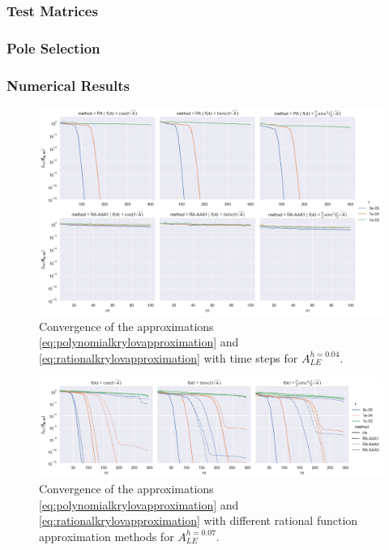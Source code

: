 \subsubsection*{Test Matrices}
\subsubsection*{Pole Selection}
\subsubsection*{Numerical Results}

\begin{figure}[h]
    \centering
    \includegraphics[width=.9\textwidth]{img/trigonometric/cnvg_h4e-02_methods_PA:RA.png}
    \caption{
        Convergence of the approximations \eqref{eq:polynomialkrylovapproximation}
        and \eqref{eq:rationalkrylovapproximation} with time steps for $A_{LE}^{h=0.04}$.
        }
        \label{fig:trigonometricconvergencetimesteps}
\end{figure}

\begin{figure}[h]
        \centering
        \includegraphics[width=.9\textwidth]{img/trigonometric/cnvg_h7e-02_methods.png}
        \caption{
            Convergence of the approximations \eqref{eq:polynomialkrylovapproximation}
            and \eqref{eq:rationalkrylovapproximation} with different
            rational function approximation methods for $A_{LE}^{h=0.07}$.
        }
        \label{fig:trigonometricconvergencemethods}
\end{figure}

